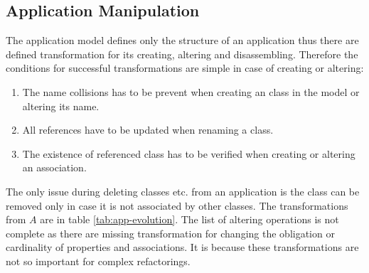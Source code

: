 \documentclass[runningheads]{comsis}
\begin{document}
\subsection{Application Manipulation}
\label{sec:app-evolution}
The application model defines only the structure of an application thus there are defined transformation for its creating, altering and disassembling. Therefore the conditions for successful transformations are simple in case of creating or altering:
\begin{enumerate}
	\item The name collisions has to be prevent when creating an class in the model or altering its name.
	\item All references have to be updated when renaming a class.
	\item The existence of referenced class has to be verified when creating or altering an association.  
\end{enumerate}
The only issue during deleting classes etc. from an application is the class can be removed only in case it is not associated by other classes. The transformations from $A$ are in table \ref{tab:app-evolution}. The list of altering operations is not complete as there are missing transformation for changing the obligation or cardinality of properties and associations. It is because these transformations are not so important for complex refactorings. 
\end{document}
